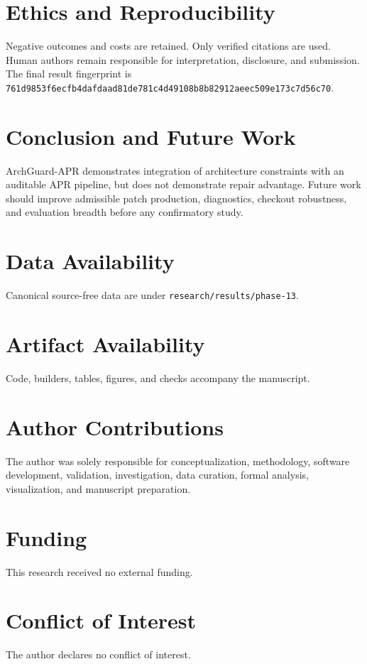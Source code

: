 \documentclass[10pt,journal]{IEEEtran}
\begin{document}
\section{Ethics and Reproducibility}
Negative outcomes and costs are retained. Only verified citations are used. Human authors remain
responsible for interpretation, disclosure, and submission. The final result fingerprint is
\texttt{761d9853f6ecfb4dafdaad81de781c4d49108b8b82912aeec509e173c7d56c70}.

\section{Conclusion and Future Work}
ArchGuard-APR demonstrates integration of architecture constraints with an auditable APR pipeline, but
does not demonstrate repair advantage. Future work should improve admissible patch production,
diagnostics, checkout robustness, and evaluation breadth before any confirmatory study.

\section*{Data Availability}Canonical source-free data are under \texttt{research/results/phase-13}.
\section*{Artifact Availability}Code, builders, tables, figures, and checks accompany the manuscript.
\section*{Author Contributions}The author was solely responsible for conceptualization,
methodology, software development, validation, investigation, data curation, formal analysis,
visualization, and manuscript preparation.
\section*{Funding}This research received no external funding.
\section*{Conflict of Interest}The author declares no conflict of interest.

\end{document}
